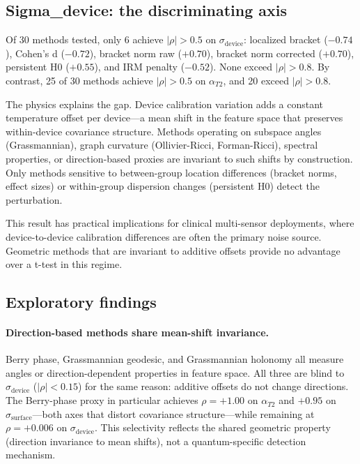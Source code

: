 \documentclass[11pt]{article}
\begin{document}
\subsection{Sigma\_device: the discriminating axis}

Of 30 methods tested, only 6 achieve $|\rho| > 0.5$ on
$\sigma_\text{device}$: localized bracket ($-0.74$), Cohen's d
($-0.72$), bracket norm raw ($+0.70$), bracket norm corrected
($+0.70$), persistent H0 ($+0.55$), and IRM penalty ($-0.52$).
None exceed $|\rho| > 0.8$.
By contrast, 25 of 30 methods achieve $|\rho| > 0.5$ on
$\alpha_{T2}$, and 20 exceed $|\rho| > 0.8$.

The physics explains the gap.  Device calibration variation adds a
constant temperature offset per device---a mean shift in the feature
space that preserves within-device covariance structure.  Methods
operating on subspace angles (Grassmannian), graph curvature
(Ollivier-Ricci, Forman-Ricci), spectral properties, or
direction-based proxies are invariant to such shifts by construction.
Only methods sensitive to between-group location differences
(bracket norms, effect sizes) or within-group dispersion changes
(persistent H0) detect the perturbation.

This result has practical implications for clinical multi-sensor
deployments, where device-to-device calibration differences are often
the primary noise source.  Geometric methods that are invariant to
additive offsets provide no advantage over a t-test in this regime.

\subsection{Exploratory findings}

\paragraph{Direction-based methods share mean-shift invariance.}
Berry phase, Grassmannian geodesic, and Grassmannian holonomy all
measure angles or direction-dependent properties in feature space.
All three are blind to $\sigma_\text{device}$ ($|\rho| < 0.15$) for
the same reason: additive offsets do not change directions.  The
Berry-phase proxy in particular achieves $\rho = +1.00$ on
$\alpha_{T2}$ and $+0.95$ on $\sigma_\text{surface}$---both axes
that distort covariance structure---while remaining at $\rho = +0.006$
on $\sigma_\text{device}$.  This selectivity reflects the shared
geometric property (direction invariance to mean shifts), not a
quantum-specific detection mechanism.
\end{document}
